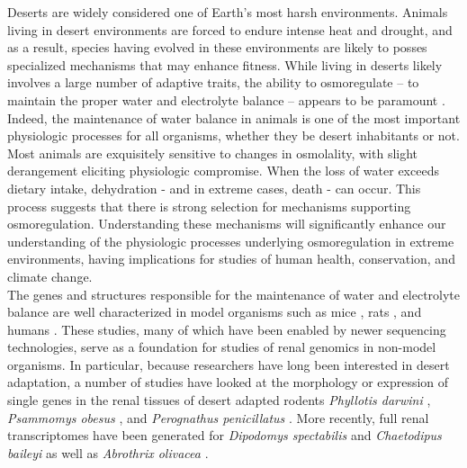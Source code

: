 \documentclass[11pt]{article}
\begin{document}
Deserts are widely considered one of Earth's most harsh environments. Animals living in desert environments are forced to endure intense heat and drought, and as a result, species having evolved in these environments are likely to posses specialized mechanisms that may enhance fitness. While living in deserts likely involves a large number of adaptive traits, the ability to osmoregulate -- to maintain the proper water and electrolyte balance -- appears to be paramount \cite{Walsberg:2000uu}. Indeed, the maintenance of water balance in animals is one of the most important physiologic processes for all organisms, whether they be desert inhabitants or not. Most animals are exquisitely sensitive to changes in osmolality, with slight derangement eliciting physiologic compromise.  When the loss of water exceeds dietary intake, dehydration - and in extreme cases, death - can occur. This process suggests that there is strong selection for mechanisms supporting osmoregulation. Understanding these mechanisms will significantly enhance our understanding of the physiologic processes underlying osmoregulation in extreme environments, having implications for studies of human health, conservation, and climate change. \\

The genes and structures responsible for the maintenance of water and electrolyte balance are well characterized in model organisms such as mice \cite{Tatum:2009kp}, rats \cite{Romero:2007fs,Rojek:2006dg,NIELSEN:1995uq}, and humans \cite{Mobasheri:2007tt,Bedford:2003wa,NIELSEN:1999vg}. These studies, many of which have been enabled by newer sequencing technologies, serve as a foundation for studies of renal genomics in non-model organisms. In particular, because researchers have long been interested in desert adaptation, a number of studies have looked at the morphology or expression of single genes in the renal tissues of desert adapted rodents \textit{Phyllotis darwini} \cite{Gallardo:2005fm}, \textit{Psammomys obesus} \cite{Kaissling:1975uu}, and \textit{Perognathus penicillatus} \cite{Altschuler:1979du}. More recently, full renal transcriptomes have been generated for \textit{Dipodomys spectabilis} and \textit{Chaetodipus baileyi} \cite{Marra:2014de} as well as \textit{Abrothrix olivacea} \cite{Giorello:2014iv}. \\
\end{document}
